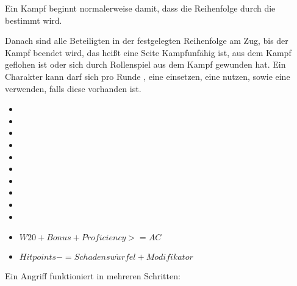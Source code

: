 Ein Kampf beginnt normalerweise damit, dass die Reihenfolge durch die  bestimmt wird.

Danach sind alle Beteiligten in der festgelegten Reihenfolge am Zug, bis der Kampf beendet wird, das heißt eine Seite Kampfunfähig ist, aus dem Kampf geflohen ist oder sich durch Rollenspiel aus dem Kampf gewunden hat.
Ein Charakter kann darf sich pro Runde , eine  einsetzen, eine  nutzen, sowie eine  verwenden, falls diese vorhanden ist.



\begin{itemize}
\item {}
\item {}
\item {}
\item {}
\item {}
\item {}
\item {}
\item {}
\item {}
\item {}
\end{itemize}



\begin{itemize}
\item $W20 + Bonus + Proficiency >= AC$

\item $Hitpoints -= Schadensw\ddot{u}rfel + Modifikator$
\end{itemize}

Ein Angriff funktioniert in mehreren Schritten:


